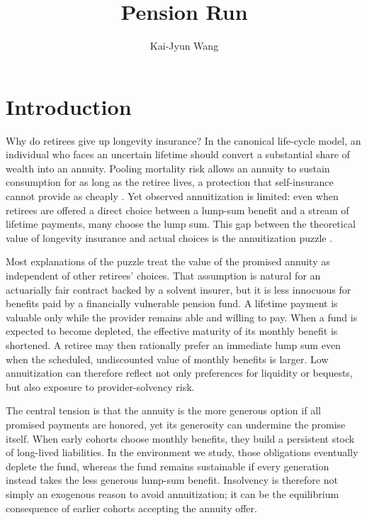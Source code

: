 \documentclass[a4paper, 12pt]{article}
\title{Pension Run}
\author{Kai-Jyun Wang}
\begin{document}
 

\maketitle

\section{Introduction}
Why do retirees give up longevity insurance? In the canonical life-cycle model,
an individual who faces an uncertain lifetime should convert a substantial share
of wealth into an annuity. Pooling mortality risk allows an annuity to sustain
consumption for as long as the retiree lives, a protection that self-insurance
cannot provide as cheaply \citep{yaari1965,davidoff2005}. Yet observed
annuitization is limited: even when retirees are offered a direct choice between
a lump-sum benefit and a stream of lifetime payments, many choose the lump sum.
This gap between the theoretical value of longevity insurance and actual choices
is the annuitization puzzle \citep{brown2008,benartzi2011}.

Most explanations of the puzzle treat the value of the promised annuity as
independent of other retirees' choices. That assumption is natural for an
actuarially fair contract backed by a solvent insurer, but it is less innocuous
for benefits paid by a financially vulnerable pension fund. A lifetime payment
is valuable only while the provider remains able and willing to pay. When a fund
is expected to become depleted, the effective maturity of its monthly benefit is
shortened. A retiree may then rationally prefer an immediate lump sum even when
the scheduled, undiscounted value of monthly benefits is larger. Low
annuitization can therefore reflect not only preferences for liquidity or
bequests, but also exposure to provider-solvency risk.

The central tension is that the annuity is the more generous option if all
promised payments are honored, yet its generosity can undermine the promise
itself. When early cohorts choose monthly benefits, they build a persistent stock
of long-lived liabilities. In the environment we study, those obligations
eventually deplete the fund, whereas the fund remains sustainable if every
generation instead takes the less generous lump-sum benefit. Insolvency is
therefore not simply an exogenous reason to avoid annuitization; it can be the
equilibrium consequence of earlier cohorts accepting the annuity offer.
\end{document}
